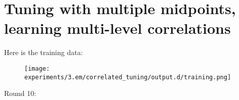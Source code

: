 
\FloatBarrier

\section{Tuning with multiple midpoints, learning multi-level correlations}

Here is the training data:

\begin{figure}
\texttt{[image: experiments/3.em/correlated\_tuning/output.d/training.png]}
\end{figure}

Round 10:



